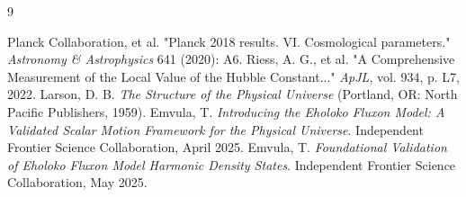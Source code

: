 \documentclass[11pt, twoside]{article}
\begin{document}

\begin{thebibliography}{9}
\raggedright

 Planck Collaboration, et al. "Planck 2018 results. VI. Cosmological parameters." \textit{Astronomy \& Astrophysics} 641 (2020): A6.
 Riess, A. G., et al. "A Comprehensive Measurement of the Local Value of the Hubble Constant..." \textit{ApJL}, vol. 934, p. L7, 2022.
 Larson, D. B. \textit{The Structure of the Physical Universe} (Portland, OR: North Pacific Publishers, 1959).
 Emvula, T. \textit{Introducing the Eholoko Fluxon Model: A Validated Scalar Motion Framework for the Physical Universe}. Independent Frontier Science Collaboration, April 2025.
 Emvula, T. \textit{Foundational Validation of Eholoko Fluxon Model Harmonic Density States}. Independent Frontier Science Collaboration, May 2025.

\end{thebibliography}
\end{document}
